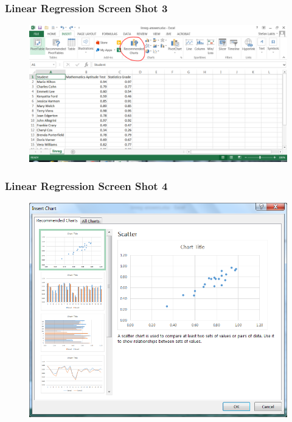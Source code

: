 \documentclass[xcolor=dvipsnames]{beamer}
\begin{document}
\begin{frame}
  \frametitle{Linear Regression Screen Shot 3}
  \begin{figure}[h]
    \includegraphics[scale=.42]{./linreg08.png}
  \end{figure}
\end{frame}

\begin{frame}
  \frametitle{Linear Regression Screen Shot 4}
  \begin{figure}[h]
    \includegraphics[scale=.42]{./linreg03.png}
  \end{figure}
\end{frame}
\end{document}
